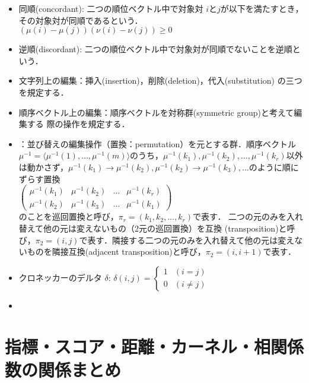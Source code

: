 \documentclass[japanese]{jnlp_1.4}
\newcommand{\modified}[1]{}
\begin{document}
\begin{itemize}
\item 同順(concordant): 二つの順位ベクトル中で対象対 $i$と$j$が以下を満たすとき，その対象対が同順であるという．\\
  $ (\mu(i)-\mu(j))(\nu(i)-\nu(j))\geq 0 $
\item 逆順(discordant): 二つの順位ベクトル中で対象対が同順でないことを逆順という．
\item 文字列上の編集：挿入(insertion)，削除(deletion)，代入(substitution)
      の三つを規定する．
\item 順序ベクトル上の編集：順序ベクトルを対称群(symmetric group)と考えて編集する
      際の操作を規定する．
\item \modified{対称群}：並び替えの編集操作（置換：permutation）を元とする群．順序ベクトル$\mu^{-1} = \langle \mu^{-1}(1), \ldots, \mu^{-1}(m) \rangle$のうち，$\mu^{-1}(k_{1}),\mu^{-1}(k_{2}),\ldots,\mu^{-1}(k_{r})$以外は動かさず，$\mu^{-1}(k_{1}) \rightarrow \mu^{-1}(k_{2}), \mu^{-1}(k_{2}) \rightarrow \mu^{-1}(k_{3}), \ldots$のように順にずらす置換 \\
  $\left(  
\begin{array}{cccc}
  \mu^{-1}(k_{1}) & \mu^{-1}(k_{2}) &  \ldots & \mu^{-1}(k_{r}) \\
  \mu^{-1}(k_{2}) & \mu^{-1}(k_{3}) &  \ldots & \mu^{-1}(k_{1})
\end{array}   \right)$ \\
のことを巡回置換と呼び，$\pi_{r}=(k_{1},k_{2},\ldots,k_{r})$で表す．
二つの元のみを入れ替えて他の元は変えないもの（2元の巡回置換）を互換
      (transposition)と呼び，$\pi_{2}=(i,j)$で表す．隣接する二つの元のみを入れ替えて他の元は変えないものを隣接互換(adjacent transposition)と呼び，$\pi_{2}=(i,i+1)$で表す．
\item クロネッカーのデルタ $\delta$:
  $\delta(i,j) = 
  \left\{ \begin{array}{ll}
          1 & (i = j) \\
          0 & (i \neq j)
    \end{array} \right. $
\item \modified{$s$再帰($s$-recursive), $t$再帰($t$-recursive): それぞれ変数$s$,
      $t$に対して再帰的に定義すること．本稿では$s$,$t$は文字列を想定し，1文字増
      やした際の文字列を定義する差分方程式の説明に用いる．}
\end{itemize}
\newpage

\section{指標・スコア・距離・カーネル・相関係数の関係まとめ}
\end{document}
